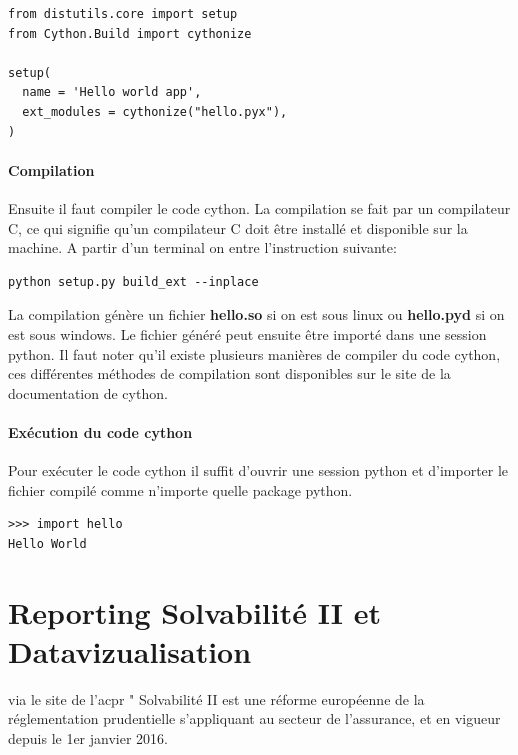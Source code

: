 \begin{verbatim}
from distutils.core import setup
from Cython.Build import cythonize

setup(
  name = 'Hello world app',
  ext_modules = cythonize("hello.pyx"),
)
\end{verbatim}

\subsubsection{Compilation}
Ensuite il faut compiler le code cython. La compilation se fait par un compilateur C, ce qui signifie qu'un compilateur C doit être installé et disponible sur la machine. A partir d'un terminal on entre l'instruction suivante:

\begin{verbatim}
python setup.py build_ext --inplace
\end{verbatim}

La compilation génère un fichier \textbf{hello.so} si on est sous linux ou \textbf{hello.pyd} si on est sous windows. Le fichier généré peut ensuite être importé dans une session python.
Il faut noter qu'il existe plusieurs manières de compiler du code cython, ces différentes méthodes de compilation sont disponibles sur le site de la documentation de cython.

\subsubsection{Exécution du code cython}
Pour exécuter le code cython il suffit d'ouvrir une session python et d'importer le fichier compilé comme n'importe quelle package python.
\begin{verbatim}
>>> import hello
Hello World
\end{verbatim}

\chapter{Reporting Solvabilité II et Datavizualisation}


via le site de l'acpr
" 
Solvabilité II est une réforme européenne de la réglementation prudentielle s’appliquant au secteur de l'assurance, et en vigueur depuis le 1er janvier 2016.


